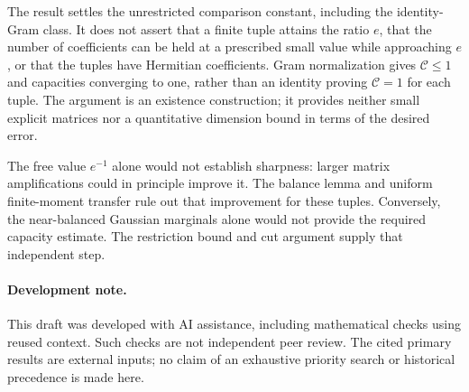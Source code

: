 \documentclass[11pt]{article}
\theoremstyle{remark}
\newcommand{\calC}{\mathcal C}
\begin{document}
The result settles the unrestricted comparison constant, including
the identity-Gram class. It does not assert that a finite tuple
attains the ratio $e$, that the number of coefficients can be held
at a prescribed small value while approaching $e$, or that the
tuples have Hermitian coefficients. Gram normalization gives
$\calC\leq1$ and capacities converging to one, rather than an
identity proving $\calC=1$ for each tuple. The argument is an
existence construction; it provides neither small explicit matrices
nor a quantitative dimension bound in terms of the desired error.

The free value $e^{-1}$ alone would not establish sharpness:
larger matrix amplifications could in principle improve it.
The balance lemma and uniform finite-moment transfer rule out that
improvement for these tuples. Conversely, the near-balanced Gaussian
marginals alone would not provide the required capacity estimate.
The restriction bound and cut argument supply that independent step.

\paragraph{Development note.}
This draft was developed with AI assistance, including mathematical
checks using reused context. Such checks are not independent peer
review. The cited primary results are external inputs; no claim of
an exhaustive priority search or historical precedence is made here.
\end{document}

